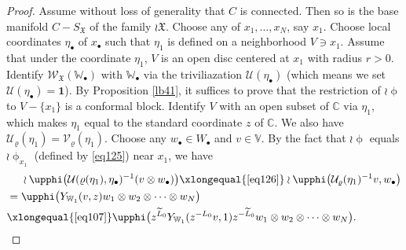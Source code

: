 \documentclass[12pt,a4paper,notitlepage]{report}
\theoremstyle{definition}
\theoremstyle{plain}
\newcommand{\fk}{\mathfrak}
\newcommand{\mc}{\mathcal}
\newcommand{\wtd}{\widetilde}
\newcommand{\id}{\mathbf{1}}
\newcommand{\scr}{\mathscr}
\newcommand{\blt}{\bullet}
\newcommand{\Vbb}{\mathbb V}
\newcommand{\Wbb}{\mathbb W}
\newcommand{\Cbb}{\mathbb C}
\numberwithin{equation}{section}
\begin{document}
\begin{proof}
Assume without loss of generality that $C$ is connected. Then so is the base manifold $C-S_{\fk X}$ of the family $\wr\fk X$. Choose any of $x_1,\dots,x_N$, say $x_1$. Choose local coordinates $\eta_\blt$ of $x_\blt$ such that  $\eta_1$ is defined on a neighborhood $V\ni x_1$. Assume that under the coordinate $\eta_1$, $V$ is an open disc centered at $x_1$ with radius $r>0$. Identify $\scr W_{\fk X}(\Wbb_\blt)$ with $\Wbb_\blt$ via the triviliazation $\mc U(\eta_\blt)$ (which means we set $\mc U(\eta_\blt)=\id$). By Proposition \ref{lb41}, it suffices to prove that the restriction of $\wr\upphi$ to $V-\{x_1\}$ is a conformal block. Identify $V$ with an open subset of $\Cbb$ via $\eta_1$, which makes  $\eta_1$ equal to the standard coordinate $z$ of $\Cbb$. We also have $\mc U_\varrho(\eta_1)=\mc V_\varrho(\eta_1)$. Choose any $w_\blt\in W_\blt$ and $v\in\Vbb$. By the fact that $\wr\upphi$ equals $\wr\upphi_{x_1}$ (defined by \eqref{eq125}) near $x_1$, we have
\begin{align}
&~~~~\wr\upphi\big(\mc U(\varrho(\eta_1),\eta_\blt)^{-1}(v\otimes w_\blt)\big)\xlongequal{\eqref{eq126}}\wr\upphi\big(\mc U_\varrho(\eta_1)^{-1}v, w_\blt\big)\nonumber\\
&=\upphi\big(Y_{\Wbb_1}(v,z)w_1\otimes w_2\otimes \dots\otimes w_N\big)\nonumber\\
&\xlongequal{\eqref{eq107}}\upphi\big(z^{\wtd L_0}Y_{\Wbb_1}(z^{-L_0}v,1)z^{-\wtd L_0}w_1\otimes w_2\otimes \dots\otimes w_N\big).\label{eq127}
\end{align}


\end{proof}
\end{document}
